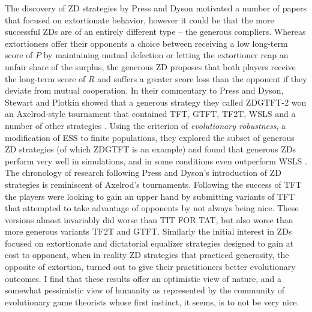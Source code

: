 The discovery of ZD strategies by Press and Dyson motivated a number of papers that focused on extortionate behavior, however it could be that the more successful ZDs are of an entirely different type -- the generous compliers. Whereas extortioners offer their opponents a choice between receiving a low long-term score of $P$ by maintaining mutual defection or letting the extortioner reap an unfair share of the surplus, the generous ZD proposes that both players receive the long-term score of $R$ and suffers a greater score loss than the opponent if they deviate from mutual cooperation. In their commentary to Press and Dyson, Stewart and Plotkin showed that a generous strategy they called ZDGTFT-2 won an Axelrod-style tournament that contained TFT, GTFT, TF2T, WSLS and a number of other strategies \cite{Stewart26062012}. Using the criterion of \textit{evolutionary robustness}, a modification of ESS to finite populations, they explored the subset of generous ZD strategies (of which ZDGTFT is an example) and found that generous ZDs perform very well in simulations, and in some conditions even outperform WSLS \cite{Stewart03092013}. The chronology of research following Press and Dyson's introduction of ZD strategies is reminiscent of Axelrod's tournaments. Following the success of TFT the players were looking to gain an upper hand by submitting variants of TFT that attempted to take advantage of opponents by not always being nice. These versions almost invariably did worse than TIT FOR TAT, but also worse than more generous variants TF2T and GTFT. Similarly the initial interest in ZDs focused on extortionate and dictatorial equalizer strategies designed to gain at cost to opponent, when in reality ZD strategies that practiced generosity, the opposite of extortion, turned out to give their practitioners better evolutionary outcomes. I find that these results offer an optimistic view of nature, and a somewhat pessimistic view of humanity as represented by the community of evolutionary game theorists whose first instinct, it seems, is to not be very nice.





\singlespacing


